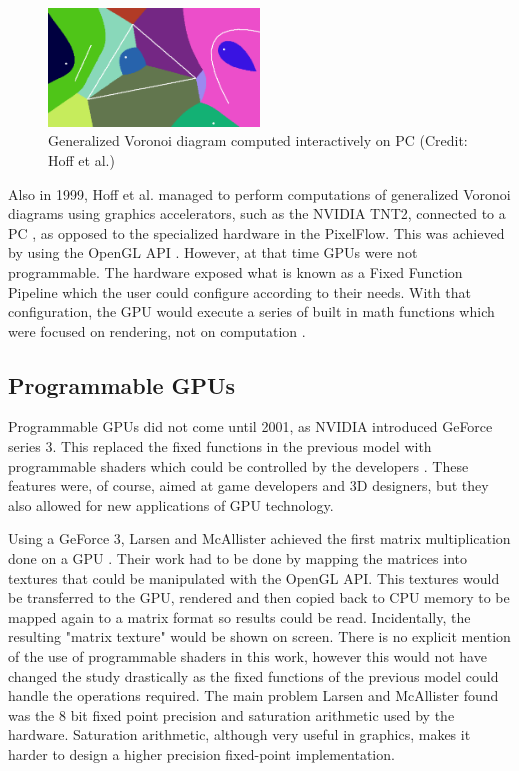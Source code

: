 \begin{figure}[h]
    \centering
    \includegraphics[width=0.5\textwidth]{img/voronoi.png}
    \captionsetup{justification=centering}
    \caption{Generalized Voronoi diagram computed interactively on PC (Credit: Hoff et al.)}
\end{figure}

Also in 1999, Hoff et al. \cite{voronoi_diagrams_gpgpu} managed to perform computations of generalized Voronoi diagrams using graphics accelerators, such as the NVIDIA TNT2, connected to a PC \cite{brief_history_gpgpu}, as opposed to the specialized hardware in the PixelFlow. This was achieved by using the OpenGL API \cite{opengl}. However, at that time GPUs were not programmable. The hardware exposed what is known as a Fixed Function Pipeline which the user could configure according to their needs. With that configuration, the GPU would execute a series of built in math functions which were focused on rendering, not on computation \cite{opengl_fixed_function_pipeline}.

\subsection{Programmable GPUs}
Programmable GPUs did not come until 2001, as NVIDIA introduced GeForce series 3. This replaced the fixed functions in the previous model with programmable shaders which could be controlled by the developers \cite{nvidia_nfinitefx_pixel, nvidia_nfinitefx_vertex}. These features were, of course, aimed at game developers and 3D designers, but they also allowed for new applications of GPU technology.

Using a GeForce 3, Larsen and McAllister achieved the first matrix multiplication done on a GPU \cite{early_matrix_multiplication_gpgpu}. Their work had to be done by mapping the matrices into textures that could be manipulated with the OpenGL API. This textures would be transferred to the GPU, rendered and then copied back to CPU memory to be mapped again to a matrix format so results could be read. Incidentally, the resulting "matrix texture" would be shown on screen. There is no explicit mention of the use of programmable shaders in this work, however this would not have changed the study drastically as the fixed functions of the previous model could handle the operations required. The main problem Larsen and McAllister found was the 8 bit fixed point precision and saturation arithmetic used by the hardware. Saturation arithmetic, although very useful in graphics, makes it harder to design a higher precision fixed-point implementation.

